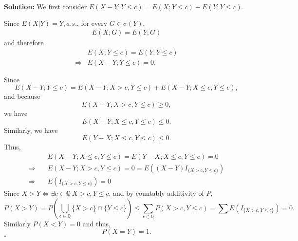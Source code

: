 \documentclass[UTF8, 12pt]{article}
\newenvironment{solution}{\noindent\ignorespaces\textbf{Solution:}}{\hfill $\square$\par\noindent}
\begin{document}
    \begin{solution}
        We first consider $E(X-Y;Y\leq c) = E(X;Y\leq c) - E(Y;Y\leq c)$.

        Since $E(X|Y) = Y, a.s.$, for every $G \in \sigma(Y)$, 
        \begin{align*}
            E(X;G) = E(Y;G)
        \end{align*}
        and therefore
        \begin{align*} 
            &E(X;Y\leq c) = E(Y;Y\leq c) \\
            \Longrightarrow &E(X-Y; Y\leq c) = 0.
        \end{align*}

        Since $$E(X-Y; Y\leq c) = E(X-Y; X > c, Y \leq c) + E(X-Y; X \leq c, Y \leq c), $$
        and because $$E(X-Y; X > c, Y \leq c) \geq 0 ,$$
        we have $$ E(X-Y; X \leq c, Y \leq c) \leq 0 .$$
        Similarly, we have $$ E(Y-X; X \leq c, Y \leq c) \leq 0 .$$
        Thus, 
        \begin{align*} 
            &E(X-Y; X \leq c, Y \leq c) = E(Y-X; X \leq c, Y \leq c) = 0 \\
            \Longrightarrow \quad &E(X-Y; X > c, Y \leq c) = 0 = E((X-Y)I_{\{X > c, Y \leq c\}}) \\
            \Longrightarrow \quad &E(I_{\{X > c, Y \leq c\}}) = 0
        \end{align*}
        Since $X > Y \Longleftrightarrow \exists c\in\mathbb{Q}\ X > c, Y \leq c$, and by countably additivity of $P$, 
        $$ P(X > Y) = P(\bigcup_{c\in\mathbb{Q}} \{X > c\} \cap \{Y \leq c\})\leq \sum_{c\in\mathbb{Q}} P(X > c, Y \leq c) = \sum E(I_{\{X > c, Y \leq c\}}) = 0. $$
        Similarly $ P(X < Y) = 0$ and thus, $$ P(X = Y) = 1. $$
    \end{solution}
\end{document}
